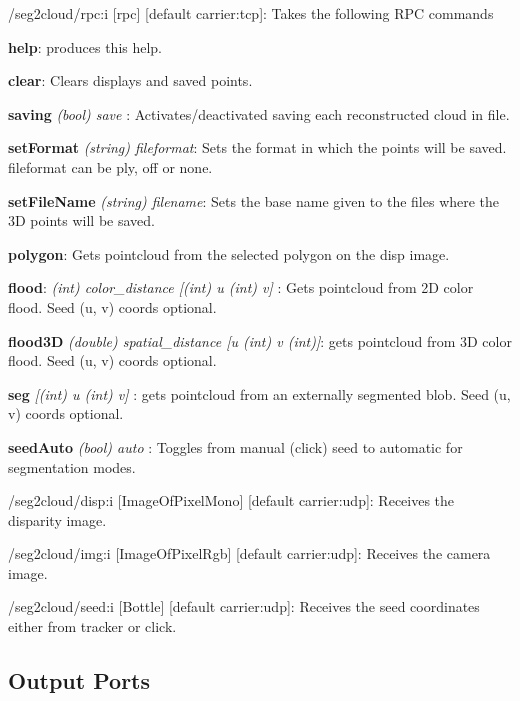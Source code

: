 \begin{DoxyItemize}
\item /seg2cloud/rpc\+:i \mbox{[}rpc\mbox{]} \mbox{[}default carrier\+:tcp\mbox{]}\+: Takes the following R\+PC commands
\begin{DoxyEnumerate}
\item {\bfseries help}\+: produces this help.
\item {\bfseries clear}\+: Clears displays and saved points.
\item {\bfseries saving} {\itshape (bool) save }\+: Activates/deactivated saving each reconstructed cloud in file.
\item {\bfseries set\+Format } {\itshape (string) fileformat}\+: Sets the format in which the points will be saved. \textquotesingle{}fileformat\textquotesingle{} can be \textquotesingle{}ply\textquotesingle{}, \textquotesingle{}off\textquotesingle{} or \textquotesingle{}none\textquotesingle{}.
\item {\bfseries set\+File\+Name } {\itshape  (string) filename}\+: Sets the base name given to the files where the 3D points will be saved.
\item {\bfseries polygon}\+: Gets pointcloud from the selected polygon on the disp image.
\item {\bfseries flood}\+: {\itshape  (int) color\+\_\+distance \mbox{[}(int) u (int) v\mbox{]} }\+: Gets pointcloud from 2D color flood. Seed (u, v) coords optional.
\item {\bfseries flood3D } {\itshape  (double) spatial\+\_\+distance \mbox{[}u (int) v (int)\mbox{]}}\+: gets pointcloud from 3D color flood. Seed (u, v) coords optional.
\item {\bfseries seg} {\itshape  \mbox{[}(int) u (int) v\mbox{]} }\+: gets pointcloud from an externally segmented blob. Seed (u, v) coords optional.
\item {\bfseries seed\+Auto} {\itshape (bool) auto }\+: Toggles from manual (click) seed to \textquotesingle{}automatic\textquotesingle{} for segmentation modes.
\end{DoxyEnumerate}
\item /seg2cloud/disp\+:i \mbox{[}Image\+Of\+Pixel\+Mono\mbox{]} \mbox{[}default carrier\+:udp\mbox{]}\+: Receives the disparity image.
\item /seg2cloud/img\+:i \mbox{[}Image\+Of\+Pixel\+Rgb\mbox{]} \mbox{[}default carrier\+:udp\mbox{]}\+: Receives the camera image.
\item /seg2cloud/seed\+:i \mbox{[}Bottle\mbox{]} \mbox{[}default carrier\+:udp\mbox{]}\+: Receives the seed coordinates either from tracker or click.
\end{DoxyItemize}\hypertarget{group__seg2cloud_outputports_sec}{}\subsection{Output Ports}\label{group__seg2cloud_outputports_sec}

